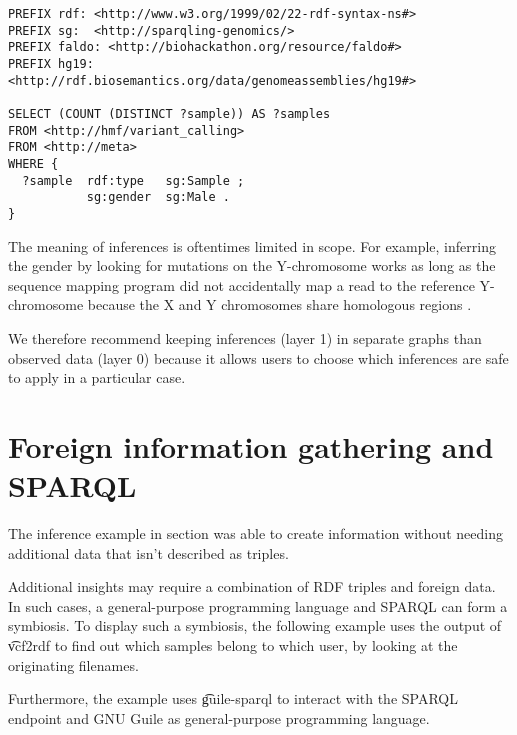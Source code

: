 \begin{lstlisting}[language=SPARQL]
PREFIX rdf: <http://www.w3.org/1999/02/22-rdf-syntax-ns#>
PREFIX sg:  <http://sparqling-genomics/>
PREFIX faldo: <http://biohackathon.org/resource/faldo#>
PREFIX hg19:  <http://rdf.biosemantics.org/data/genomeassemblies/hg19#>

SELECT (COUNT (DISTINCT ?sample)) AS ?samples
FROM <http://hmf/variant_calling>
FROM <http://meta>
WHERE {
  ?sample  rdf:type   sg:Sample ;
           sg:gender  sg:Male .
}
\end{lstlisting}

  The meaning of inferences is oftentimes limited in scope.  For example,
  inferring the gender by looking for mutations on the Y-chromosome works
  as long as the sequence mapping program did not accidentally map a read
  to the reference Y-chromosome because the X and Y chromosomes share
  homologous regions \citep{El-Mogharbel2008}.

  We therefore recommend keeping inferences (layer 1) in separate graphs
  than observed data (layer 0) because it allows users to choose which
  inferences are safe to apply in a particular case.


\section{Foreign information gathering and SPARQL}

  The inference example in section 
  was able to create information without needing additional data that isn't
  described as triples.

  Additional insights may require a combination of RDF triples and foreign
  data.  In such cases, a general-purpose programming language and SPARQL can
  form a symbiosis.  To display such a symbiosis, the following example uses
  the output of \t{vcf2rdf} to find out which samples belong to which
  user, by looking at the originating filenames.

  Furthermore, the example uses \t{guile-sparql} to interact with the
  SPARQL endpoint and GNU Guile as general-purpose programming language.

